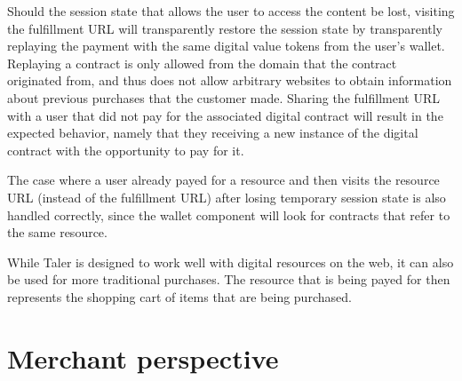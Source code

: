 \documentclass[twoside,letterpaper]{sigalternate}
\begin{document}

Should the session state that allows the user to access the content be lost,
visiting the fulfillment URL will transparently restore the session state by
transparently replaying the payment with the same digital value tokens from the
user's wallet.  Replaying a contract is only allowed from the domain that the
contract originated from, and thus does not allow arbitrary websites to obtain
information about previous purchases that the customer made.  Sharing the
fulfillment URL with a user that did not pay for the associated digital
contract will result in the expected behavior, namely that they receiving a new
instance of the digital contract with the opportunity to pay for it.


The case where a user already payed for a resource and then visits
the resource URL (instead of the fulfillment URL) after losing temporary
session state is also handled correctly, since the wallet component will
look for contracts that refer to the same resource.

While Taler is designed to work well with digital resources on the web,
it can also be used for more traditional purchases.  The resource that
is being payed for then represents the shopping cart of items that
are being purchased.

\section{Merchant perspective}



\end{document}
